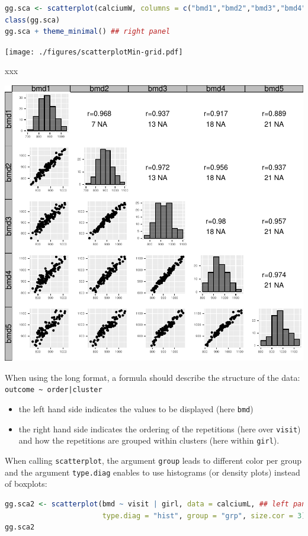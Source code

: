\documentclass[12pt]{article}
\begin{document}
\begin{lstlisting}[language=r,numbers=none]
gg.sca <- scatterplot(calciumW, columns = c("bmd1","bmd2","bmd3","bmd4","bmd5")) 
class(gg.sca)
gg.sca + theme_minimal() ## right panel
\end{lstlisting}

\begin{center}
\texttt{[image: ./figures/scatterplotMin-grid.pdf]}
\end{center}



xxx

\begin{center}
\includegraphics[trim={0 0 0 0},width=\textwidth]{./figures/scatterplot-grid.pdf}
\end{center}


\noindent When using the long format, a formula should describe the
structure of the data: \texttt{outcome \textasciitilde{} order|cluster}
\begin{itemize}
\item the left hand side indicates the values to be displayed (here \texttt{bmd})
\item the right hand side indicates the ordering of the repetitions (here over \texttt{visit}) and
how the repetitions are grouped within clusters (here within \texttt{girl}).
\end{itemize}

When calling \texttt{scatterplot}, the argument \texttt{group} leads to different
color per group and the argument \texttt{type.diag} enables to use histograms
(or density plots) instead of boxplots:
\begin{lstlisting}[language=r,numbers=none]
gg.sca2 <- scatterplot(bmd ~ visit | girl, data = calciumL, ## left panel
                       type.diag = "hist", group = "grp", size.cor = 3)
gg.sca2
\end{lstlisting}
\end{document}
